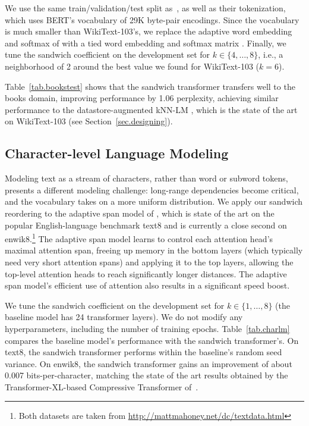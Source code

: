 \documentclass[11pt,a4paper]{article}
\begin{document}
We use the same train/validation/test split as~\citet{urvashi}, as well as their tokenization, which uses BERT's vocabulary of 29K byte-pair encodings.
Since the vocabulary is much smaller than WikiText-103's, we replace the adaptive word embedding and softmax of \citet{baevski2018adaptive} with a tied word embedding and softmax matrix \cite{press2017,inan2017}.
Finally, we tune the sandwich coefficient on the development set for $k \in \{ 4, \ldots, 8\}$, i.e., a neighborhood of 2 around the best value we found for WikiText-103 ($k=6$).

Table~\ref{tab.bookstest} shows that the sandwich transformer transfers well to the books domain, improving performance by 1.06 perplexity, achieving similar performance to the datastore-augmented kNN-LM \cite{urvashi}, which is the state of the art on WikiText-103 (see Section~\ref{sec.designing}).




\subsection{Character-level Language Modeling}
\label{sec.charlm}

Modeling text as a stream of characters, rather than word or subword tokens, presents a different modeling challenge: long-range dependencies become critical, and the vocabulary takes on a more uniform distribution.
We apply our sandwich reordering to the adaptive span model of \citet{Sukhbaatar2019}, which is state of the art on the popular English-language benchmark text8 and is currently a close second on enwik8.\footnote{{Both datasets are taken from \url{http://mattmahoney.net/dc/textdata.html}}}
The adaptive span model learns to control each attention head's maximal attention span, freeing up memory in the bottom layers (which typically need very short attention spans) and applying it to the top layers, allowing the top-level attention heads to reach significantly longer distances.
The adaptive span model's efficient use of attention also results in a significant speed boost.

We tune the sandwich coefficient on the development set for $k \in \{ 1, \ldots, 8\}$ (the baseline model has 24 transformer layers). We do not modify any hyperparameters, including the number of training epochs.
Table~\ref{tab.charlm} compares the baseline model's performance with the sandwich transformer's. 
On text8, the sandwich transformer performs within the baseline's random seed variance. On enwik8, the sandwich transformer gains an improvement of about 0.007 bits-per-character, matching the state of the art results obtained by the Transformer-XL-based Compressive Transformer of~\citet{compressive}.
\end{document}
